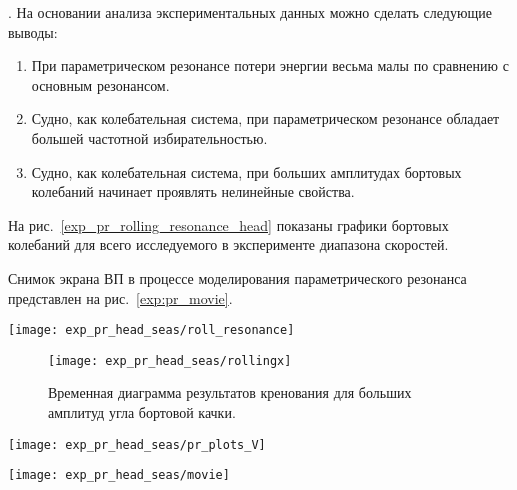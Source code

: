 . На основании анализа экспериментальных данных можно сделать следующие выводы:
\begin{enumerate}
	\item	При параметрическом резонансе потери энергии весьма малы по сравнению с основным резонансом. 
	\item	Судно, как колебательная система, при параметрическом резонансе обладает большей частотной избирательностью.
	\item	Судно, как колебательная система, при больших амплитудах бортовых колебаний начинает проявлять нелинейные свойства.
\end{enumerate}

На рис.~\ref{exp_pr_rolling_resonance_head} показаны графики бортовых колебаний для всего исследуемого в эксперименте диапазона скоростей.

Снимок экрана ВП в процессе моделирования параметрического резонанса представлен на рис.~\ref{exp:pr_movie}.

\begin{sidewaysfigure}
	\begin{center}
	\texttt{[image: exp\_pr\_head\_seas/roll\_resonance]}
	\end{center}
	\caption{График 10\%-ной обеспеченности модуля угла бортовой качки в зависимости от скорости судна.}
	\label{pr2_res}
\end{sidewaysfigure}



\begin{figure}[h!]
	\begin{center}
	\texttt{[image: exp\_pr\_head\_seas/rollingx]}
	\end{center}
	\caption{Временная диаграмма результатов кренования для больших амплитуд угла бортовой качки.}
	\label{rollingx}
\end{figure}


\begin{sidewaysfigure}
	\begin{center}
	\texttt{[image: exp\_pr\_head\_seas/pr\_plots\_V]}
	\end{center}
	\caption{Временные диаграммы качки для диапазона скоростей $6.5..9\ \text{м/с}$.}
	\label{exp_pr_rolling_resonance_head}
\end{sidewaysfigure}

\begin{sidewaysfigure}
	\begin{center}
	\texttt{[image: exp\_pr\_head\_seas/movie]}
	\end{center}
	\caption{Опасный крен вызванный параметрическим резонансом на встречном волнении}
	\label{exp:pr_movie}
\end{sidewaysfigure}


